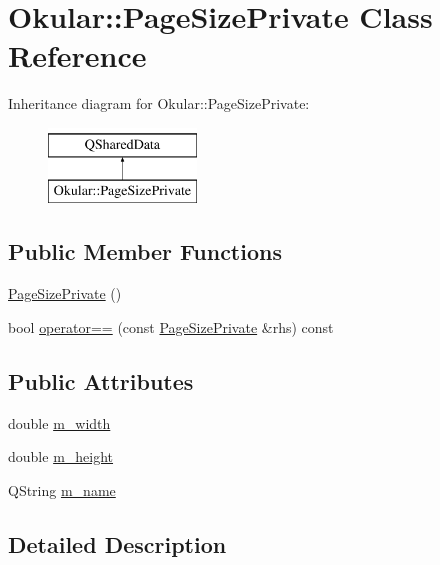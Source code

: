 \hypertarget{classOkular_1_1PageSizePrivate}{\section{Okular\+:\+:Page\+Size\+Private Class Reference}
\label{classOkular_1_1PageSizePrivate}
}
Inheritance diagram for Okular\+:\+:Page\+Size\+Private\+:\begin{figure}[H]
\begin{center}
\leavevmode
\includegraphics[height=2.000000cm]{classOkular_1_1PageSizePrivate}
\end{center}
\end{figure}
\subsection*{Public Member Functions}
\begin{DoxyCompactItemize}
\item 
\hyperlink{classOkular_1_1PageSizePrivate_a88658c5d0107e9ebfb98442152c4c8f8}{Page\+Size\+Private} ()
\item 
bool \hyperlink{classOkular_1_1PageSizePrivate_afd7d2d892bc3f904346168dbe8dfa067}{operator==} (const \hyperlink{classOkular_1_1PageSizePrivate}{Page\+Size\+Private} \&rhs) const 
\end{DoxyCompactItemize}
\subsection*{Public Attributes}
\begin{DoxyCompactItemize}
\item 
double \hyperlink{classOkular_1_1PageSizePrivate_a584076036562280f8d6c2819abeda0c6}{m\+\_\+width}
\item 
double \hyperlink{classOkular_1_1PageSizePrivate_a250e1594686902033927d7369eb0d69b}{m\+\_\+height}
\item 
Q\+String \hyperlink{classOkular_1_1PageSizePrivate_a28dc277bc4476684a305a6f87cefb518}{m\+\_\+name}
\end{DoxyCompactItemize}


\subsection{Detailed Description}


